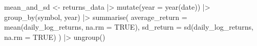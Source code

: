 \documentclass[
  12pt]{article}
\newenvironment{Shaded}{\begin{snugshade}}{\end{snugshade}}
\newcommand{\AttributeTok}[1]{\textcolor[rgb]{0.40,0.45,0.13}{#1}}
\newcommand{\ConstantTok}[1]{\textcolor[rgb]{0.56,0.35,0.01}{#1}}
\newcommand{\FunctionTok}[1]{\textcolor[rgb]{0.28,0.35,0.67}{#1}}
\newcommand{\NormalTok}[1]{\textcolor[rgb]{0.00,0.23,0.31}{#1}}
\newcommand{\OtherTok}[1]{\textcolor[rgb]{0.00,0.23,0.31}{#1}}
\newcommand{\SpecialCharTok}[1]{\textcolor[rgb]{0.37,0.37,0.37}{#1}}
\theoremstyle{definition}
\theoremstyle{remark}
\begin{document}
\begin{Shaded}
\begin{Highlighting}[]
\NormalTok{mean\_and\_sd }\OtherTok{\textless{}{-}} 
\NormalTok{  returns\_data }\SpecialCharTok{|\textgreater{}} 
  \FunctionTok{mutate}\NormalTok{(}\AttributeTok{year =} \FunctionTok{year}\NormalTok{(date)) }\SpecialCharTok{|\textgreater{}} 
  \FunctionTok{group\_by}\NormalTok{(symbol, year) }\SpecialCharTok{|\textgreater{}} 
  \FunctionTok{summarise}\NormalTok{(}
    \AttributeTok{average\_return =} \FunctionTok{mean}\NormalTok{(daily\_log\_returns, }\AttributeTok{na.rm =} \ConstantTok{TRUE}\NormalTok{), }
    \AttributeTok{sd\_return =} \FunctionTok{sd}\NormalTok{(daily\_log\_returns, }\AttributeTok{na.rm =} \ConstantTok{TRUE}\NormalTok{)}
\NormalTok{    ) }\SpecialCharTok{|\textgreater{}} 
  \FunctionTok{ungroup}\NormalTok{()}


\end{Highlighting}
\end{Shaded}
\end{document}
